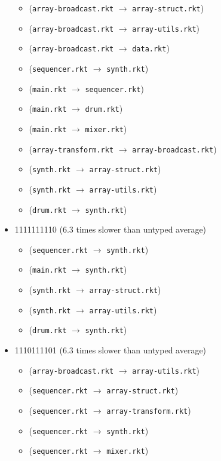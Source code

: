 \documentclass{article}
\newcommand{\mono}[1]{\texttt{#1}}
\begin{document}
\begin{itemize}
\begin{itemize}
  \item (\mono{array-broadcast.rkt} $\rightarrow$ \mono{array-struct.rkt})
  \item (\mono{array-broadcast.rkt} $\rightarrow$ \mono{array-utils.rkt})
  \item (\mono{array-broadcast.rkt} $\rightarrow$ \mono{data.rkt})
  \item (\mono{sequencer.rkt} $\rightarrow$ \mono{synth.rkt})
  \item (\mono{main.rkt} $\rightarrow$ \mono{sequencer.rkt})
  \item (\mono{main.rkt} $\rightarrow$ \mono{drum.rkt})
  \item (\mono{main.rkt} $\rightarrow$ \mono{mixer.rkt})
  \item (\mono{array-transform.rkt} $\rightarrow$ \mono{array-broadcast.rkt})
  \item (\mono{synth.rkt} $\rightarrow$ \mono{array-struct.rkt})
  \item (\mono{synth.rkt} $\rightarrow$ \mono{array-utils.rkt})
  \item (\mono{drum.rkt} $\rightarrow$ \mono{synth.rkt})
  \end{itemize}
\item 1111111110 (6.3 times slower than untyped average)
  \begin{itemize}
  \item (\mono{sequencer.rkt} $\rightarrow$ \mono{synth.rkt})
  \item (\mono{main.rkt} $\rightarrow$ \mono{synth.rkt})
  \item (\mono{synth.rkt} $\rightarrow$ \mono{array-struct.rkt})
  \item (\mono{synth.rkt} $\rightarrow$ \mono{array-utils.rkt})
  \item (\mono{drum.rkt} $\rightarrow$ \mono{synth.rkt})
  \end{itemize}
\item 1110111101 (6.3 times slower than untyped average)
  \begin{itemize}
  \item (\mono{array-broadcast.rkt} $\rightarrow$ \mono{array-utils.rkt})
  \item (\mono{sequencer.rkt} $\rightarrow$ \mono{array-struct.rkt})
  \item (\mono{sequencer.rkt} $\rightarrow$ \mono{array-transform.rkt})
  \item (\mono{sequencer.rkt} $\rightarrow$ \mono{synth.rkt})
  \item (\mono{sequencer.rkt} $\rightarrow$ \mono{mixer.rkt})

\end{itemize}
\end{itemize}
\end{document}
